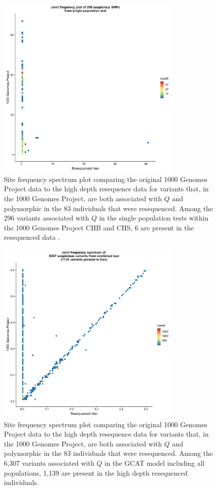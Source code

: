 \documentclass[9pt,article]{template}
\begin{document}
\begin{figure}[tbp]
\centering
\includegraphics[width=9cm,keepaspectratio]{Han_1kGP_SFS_singlePop.jpg}
\caption{Site frequency spectrum plot comparing the original 1000 Genomes Project data to the high depth resequence data for variants that, in the 1000 Genomes Project, are both associated with $Q$ and polymorphic in the 83 individuals that were resequenced.
Among the 296 variants associated with $Q$ in the single population tests within the 1000 Genomes Project CHB and CHS, 6 are present in the resequenced data \citep{Lan2017}.}  
\label{90HanSFS}
\end{figure}

\begin{figure}[tbp]
\centering
\includegraphics[width=9cm,keepaspectratio]{Han_1kGP_SFS_FullModel.jpg}
\caption{Site frequency spectrum plot comparing the original 1000 Genomes Project data to the high depth resequence data for variants that, in the 1000 Genomes Project, are both associated with $Q$ and polymorphic in the 83 individuals that were resequenced.
Among the 6,307 variants associated with $Q$ in the GCAT model including all populations, 1,139 are present in the high depth resequenced individuals.}  
\label{90HanSFS_full}
\end{figure}
\end{document}
